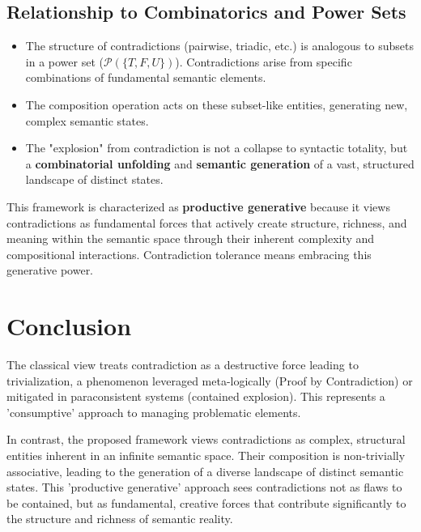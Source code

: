 	\subsection{Relationship to Combinatorics and Power Sets}
	\begin{itemize}
		\item The structure of contradictions (pairwise, triadic, etc.) is analogous to subsets in a power set ($\mathcal{P}(\{T, F, U\})$). Contradictions arise from specific combinations of fundamental semantic elements.
		\item The composition operation acts on these subset-like entities, generating new, complex semantic states.
		\item The "explosion" from contradiction is not a collapse to syntactic totality, but a \textbf{combinatorial unfolding} and \textbf{semantic generation} of a vast, structured landscape of distinct states.
	\end{itemize}
	
	This framework is characterized as \textbf{productive generative} because it views contradictions as fundamental forces that actively create structure, richness, and meaning within the semantic space through their inherent complexity and compositional interactions. Contradiction tolerance means embracing this generative power.
	
	\section{Conclusion}
	
	The classical view treats contradiction as a destructive force leading to trivialization, a phenomenon leveraged meta-logically (Proof by Contradiction) or mitigated in paraconsistent systems (contained explosion). This represents a 'consumptive' approach to managing problematic elements.
	
	In contrast, the proposed framework views contradictions as complex, structural entities inherent in an infinite semantic space. Their composition is non-trivially associative, leading to the generation of a diverse landscape of distinct semantic states. This 'productive generative' approach sees contradictions not as flaws to be contained, but as fundamental, creative forces that contribute significantly to the structure and richness of semantic reality.

